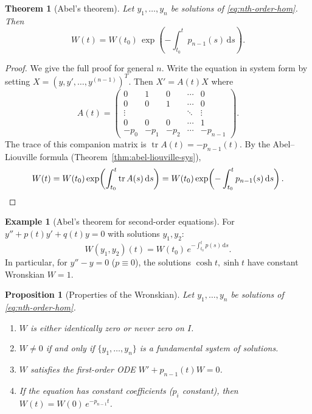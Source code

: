 \documentclass[12pt,a4paper,openany]{book}
\theoremstyle{definition}
\newtheorem{example}[definition]{Example}
\theoremstyle{plain}
\newtheorem{theorem}[definition]{Theorem}
\newtheorem{proposition}[definition]{Proposition}
\theoremstyle{remark}
\newcommand{\dd}{\mathrm{d}}
\DeclareMathOperator{\tr}{tr}
\begin{document}
\begin{theorem}[Abel's theorem]\label{thm:abel}
Let $y_1,\dots,y_n$ be solutions of \eqref{eq:nth-order-hom}.
Then
\begin{equation}\label{eq:abel}
  W(t) = W(t_0)\,\exp\!\left(-\int_{t_0}^{t}p_{n-1}(s)\,\dd s\right).
\end{equation}
\end{theorem}

\begin{proof}
We give the full proof for general $n$.  Write the equation in system
form by setting $X=(y,y',\dots,y^{(n-1)})^T$.  Then $X'=A(t)X$ where
\[
  A(t) = \begin{pmatrix}
    0 & 1 & 0 & \cdots & 0 \\
    0 & 0 & 1 & \cdots & 0 \\
    \vdots & & & \ddots & \vdots \\
    0 & 0 & 0 & \cdots & 1 \\
    -p_0 & -p_1 & -p_2 & \cdots & -p_{n-1}
  \end{pmatrix}.
\]
The trace of this companion matrix is
$\tr A(t) = -p_{n-1}(t)$.  By the Abel--Liouville formula
(Theorem~\ref{thm:abel-liouville-sys}),
\[
  W(t) = W(t_0)\exp\!\left(\int_{t_0}^t \tr A(s)\,\dd s\right)
  = W(t_0)\exp\!\left(-\int_{t_0}^t p_{n-1}(s)\,\dd s\right).
  \qedhere
\]
\end{proof}

\begin{example}[Abel's theorem for second-order equations]\label{ex:abel-2nd}
For $y''+p(t)y'+q(t)y=0$ with solutions $y_1,y_2$:
\[
  W(y_1,y_2)(t) = W(t_0)\,e^{-\int_{t_0}^t p(s)\,\dd s}.
\]
In particular, for $y''-y=0$ ($p\equiv 0$), the solutions
$\cosh t, \sinh t$ have constant Wronskian $W=1$.
\end{example}

\begin{proposition}[Properties of the Wronskian]\label{prop:wronskian-props}
Let $y_1,\dots,y_n$ be solutions of \eqref{eq:nth-order-hom}.
\begin{enumerate}[label=(\roman*)]
  \item $W$ is either identically zero or never zero on $I$.
  \item $W\neq 0$ if and only if $\{y_1,\dots,y_n\}$ is a fundamental
    system of solutions.
  \item $W$ satisfies the first-order ODE $W' + p_{n-1}(t)W = 0$.
  \item If the equation has constant coefficients ($p_i$ constant),
    then $W(t)=W(0)\,e^{-p_{n-1}t}$.
\end{enumerate}
\end{proposition}
\end{document}
